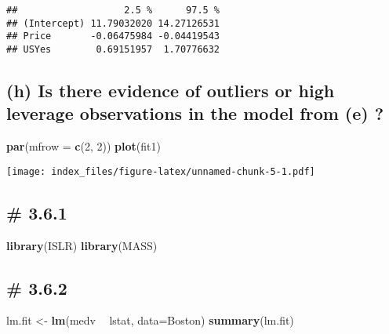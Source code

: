 \documentclass[
]{article}
\newenvironment{Shaded}{\begin{snugshade}}{\end{snugshade}}
\newcommand{\DataTypeTok}[1]{\textcolor[rgb]{0.13,0.29,0.53}{#1}}
\newcommand{\DecValTok}[1]{\textcolor[rgb]{0.00,0.00,0.81}{#1}}
\newcommand{\KeywordTok}[1]{\textcolor[rgb]{0.13,0.29,0.53}{\textbf{#1}}}
\newcommand{\NormalTok}[1]{#1}
\newcommand{\OperatorTok}[1]{\textcolor[rgb]{0.81,0.36,0.00}{\textbf{#1}}}
\newcommand{\StringTok}[1]{\textcolor[rgb]{0.31,0.60,0.02}{#1}}
\begin{document}
\begin{verbatim}
##                   2.5 %      97.5 %
## (Intercept) 11.79032020 14.27126531
## Price       -0.06475984 -0.04419543
## USYes        0.69151957  1.70776632
\end{verbatim}

\hypertarget{h-is-there-evidence-of-outliers-or-high-leverage-observations-in-the-model-from-e}{%
\subsection{(h) Is there evidence of outliers or high leverage
observations in the model from (e)
?}\label{h-is-there-evidence-of-outliers-or-high-leverage-observations-in-the-model-from-e}}

\begin{Shaded}
\begin{Highlighting}[]
\KeywordTok{par}\NormalTok{(}\DataTypeTok{mfrow =} \KeywordTok{c}\NormalTok{(}\DecValTok{2}\NormalTok{, }\DecValTok{2}\NormalTok{))}
\KeywordTok{plot}\NormalTok{(fit1)}
\end{Highlighting}
\end{Shaded}

\texttt{[image: index\_files/figure-latex/unnamed-chunk-5-1.pdf]}

\hypertarget{section}{%
\subsection{\# 3.6.1}\label{section}}

\begin{Shaded}
\begin{Highlighting}[]
\KeywordTok{library}\NormalTok{(ISLR)}
\KeywordTok{library}\NormalTok{(MASS)}
\end{Highlighting}
\end{Shaded}

\hypertarget{section-1}{%
\subsection{\# 3.6.2}\label{section-1}}

\begin{Shaded}
\begin{Highlighting}[]
\NormalTok{lm.fit <-}\StringTok{ }\KeywordTok{lm}\NormalTok{(medv }\OperatorTok{~}\StringTok{ }\NormalTok{lstat, }\DataTypeTok{data=}\NormalTok{Boston)}
\KeywordTok{summary}\NormalTok{(lm.fit)}
\end{Highlighting}
\end{Shaded}
\end{document}
